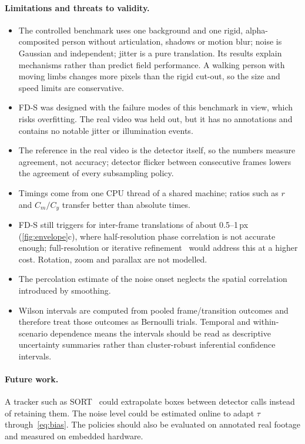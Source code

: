 \documentclass[12pt,a4paper]{article}
\theoremstyle{plain}
\theoremstyle{definition}
\newcommand{\FDS}{FD-S}
\begin{document}
\paragraph{Limitations and threats to validity.}
\begin{itemize}
\item The controlled benchmark uses one background and one rigid, alpha-composited person without articulation, shadows or motion blur; noise is Gaussian and independent; jitter is a pure translation. Its results explain mechanisms rather than predict field performance. A walking person with moving limbs changes more pixels than the rigid cut-out, so the size and speed limits are conservative.
\item \FDS{} was designed with the failure modes of this benchmark in view, which risks overfitting. The real video was held out, but it has no annotations and contains no notable jitter or illumination events.
\item The reference in the real video is the detector itself, so the numbers measure agreement, not accuracy; detector flicker between consecutive frames lowers the agreement of every subsampling policy.
\item Timings come from one CPU thread of a shared machine; ratios such as $r$ and $C_m/C_y$ transfer better than absolute times.
\item \FDS{} still triggers for inter-frame translations of about 0.5--1\,px (\cref{fig:envelope}c), where half-resolution phase correlation is not accurate enough; full-resolution or iterative refinement~\cite{lucas1981iterative,evangelidis2008ecc} would address this at a higher cost. Rotation, zoom and parallax are not modelled.
\item The percolation estimate of the noise onset neglects the spatial correlation introduced by smoothing.
\item Wilson intervals are computed from pooled frame/transition outcomes and therefore treat those outcomes as Bernoulli trials. Temporal and within-scenario dependence means the intervals should be read as descriptive uncertainty summaries rather than cluster-robust inferential confidence intervals.
\end{itemize}

\paragraph{Future work.} A tracker such as SORT~\cite{bewley2016sort} could extrapolate boxes between detector calls instead of retaining them. The noise level could be estimated online to adapt $\tau$ through~\eqref{eq:bias}. The policies should also be evaluated on annotated real footage and measured on embedded hardware.
\end{document}

